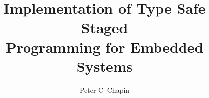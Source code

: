 \documentclass[11pt]{report}
\newcommand{\primaryspacing}{\doublespace}
\begin{document}
\title{Implementation of Type Safe Staged\\Programming for Embedded Systems}
\author{Peter C. Chapin}
\maketitle

\makeacceptance
{}






\singlespace

\tableofcontents
\clearpage

\listoftables
\clearpage

\listoffigures
\clearpage

%

\primaryspacing









\appendix

%






\primaryspacing

%
\end{document}
